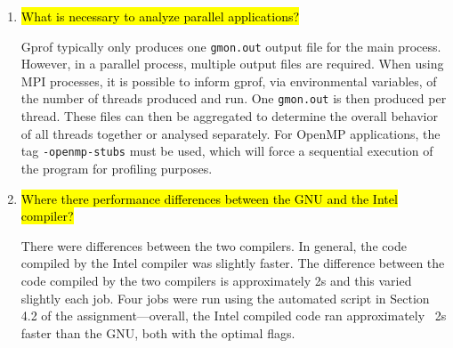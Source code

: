 \documentclass{article}
\begin{document}
\begin{enumerate}
	\item \hl{What is necessary to analyze parallel applications?}

	Gprof typically only produces one \verb!gmon.out! output file for the main process. However, in a parallel process, multiple output files are required. When using MPI processes, it is possible to inform gprof, via environmental variables, of the number of threads produced and run. One \verb!gmon.out! is then produced per thread. These files can then be aggregated to determine the overall behavior of all threads together or analysed separately. For OpenMP applications, the tag \verb!-openmp-stubs! must be used, which will force a sequential execution of the program for profiling purposes.

	\item \hl{Where there performance differences between the GNU and the Intel compiler?}

	There were differences between the two compilers. In general, the code compiled by the Intel compiler was slightly faster. The difference between the code compiled by the two compilers is approximately 2s and this varied slightly each job. Four jobs were run using the automated script in Section 4.2 of the assignment---overall, the Intel compiled code ran approximately ~2s faster than the GNU, both with the optimal flags.
\end{enumerate}
\end{document}
